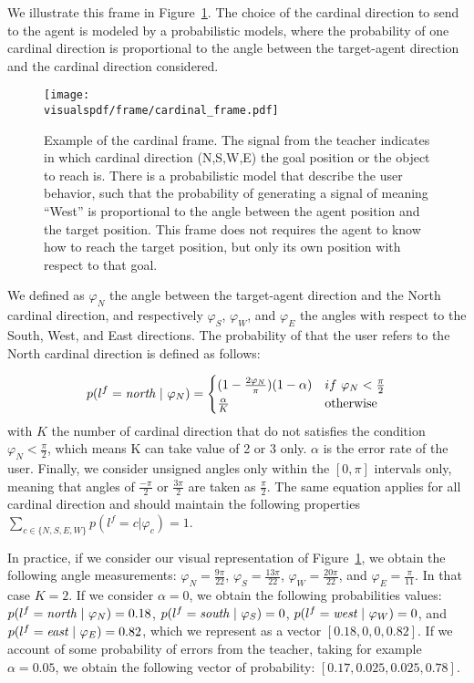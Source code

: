 We illustrate this frame in Figure~\ref{fig:cardinalframe}. The choice of the cardinal direction to send to the agent is modeled by a probabilistic models, where the probability of one cardinal direction is proportional to the angle between the target-agent direction and the cardinal direction considered.

\begin{figure}[!htbp]
    \centering
    \texttt{[image: \\visualspdf/frame/cardinal\_frame.pdf]}
    \caption{Example of the cardinal frame. The signal from the teacher indicates in which cardinal direction (N,S,W,E) the goal position or the object to reach is. There is a probabilistic model that describe the user behavior, such that the probability of generating a signal of meaning ``West'' is proportional to the angle between the agent position and the target position. This frame does not requires the agent to know how to reach the target position, but only its own position with respect to that goal.}
    \label{fig:cardinalframe}
\end{figure}

We defined as $\varphi_N$ the angle between the target-agent direction and the North cardinal direction, and respectively $\varphi_S$, $\varphi_W$, and $\varphi_E$ the angles with respect to the South, West, and East directions. The probability of that the user refers to the North cardinal direction is defined as follows:

\begin{equation}
    p(l^f = \emph{north}~|~\varphi_N) = 
    \begin{cases}
    (1 - \frac{2 \varphi_N}{\pi}) (1-\alpha) & if~\varphi_N < \frac{\pi}{2}\\
        \frac{\alpha}{K}  & \text{otherwise}\\
   \end{cases}
   \label{eq:cardinalframe}
\end{equation}
with $K$ the number of cardinal direction that do not satisfies the condition $\varphi_N < \frac{\pi}{2}$, which means K can take value of 2 or 3 only. $\alpha$ is the error rate of the user. Finally, we consider unsigned angles only within the $[0, \pi]$ intervals only, meaning that angles of $\frac{-\pi}{2}$ or $\frac{3\pi}{2}$ are taken as $\frac{\pi}{2}$. The same equation applies for all cardinal direction and should maintain the following properties $\sum_{c \in \{N,S,E,W\}} p(l^f = c |\varphi_c) = 1$.

In practice, if we consider our visual representation of Figure~\ref{fig:cardinalframe}, we obtain the following angle measurements: $\varphi_N = \frac{9\pi}{22}$, $\varphi_S = \frac{13\pi}{22}$, $\varphi_W = \frac{20\pi}{22}$, and $\varphi_E = \frac{\pi}{11}$. In that case $K = 2$. If we consider $\alpha = 0$, we obtain the following probabilities values: $p(l^f = \emph{north}~|~\varphi_N) = 0.18$, $p(l^f = \emph{south}~|~\varphi_S) = 0$, $p(l^f = \emph{west}~|~\varphi_W) = 0$, and $p(l^f = \emph{east}~|~\varphi_E) = 0.82$, which we represent as a vector $[0.18,0,0,0.82]$. If we account of some probability of errors from the teacher, taking for example $\alpha = 0.05$, we obtain the following vector of probability: $[0.17, 0.025, 0.025,0.78]$.

